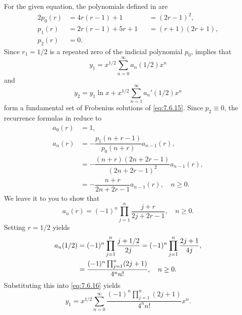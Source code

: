 \begin{solution}
For  the given equation, the polynomials defined in
 are
\begin{alignat*}{2}
p_0(r)&=4r(r-1)+1&&=(2r-1)^2,\\[5pt]
p_1(r)&=2r(r-1)+5r+1&&=(r+1)(2r+1),\\[5pt]
p_2(r)&=0.
\end{alignat*}
Since $r_1=1/2$ is a repeated zero of the  indicial polynomial $p_0$,
 implies that
\begin{equation} \label{eq:7.6.16}
y_1=x^{1/2}\sum_{n=0}^\infty  a_n(1/2)x^n
\end{equation}
and
\begin{equation} \label{eq:7.6.17}
y_2=y_1\ln x+x^{1/2}\sum_{n=1}^\infty a_n'(1/2)x^n
\end{equation}
form a fundamental set of Frobenius solutions of \eqref{eq:7.6.15}.
Since $p_2\equiv0$, the recurrence formulas in 
 reduce to
\begin{align*}
a_0(r)&=1,\\
a_n(r)&=-\dfrac{p_1(n+r-1)}{p_0(n+r)}a_{n-1}(r),\\
&=-\dfrac{(n+r)(2n+2r-1)}{(2n+2r-1)^2}a_{n-1}(r),\\
&=-\dfrac{n+r}{2n+2r-1}a_{n-1}(r),\quad n\ge0.
\end{align*}
We leave it to you to show that
\begin{equation} \label{eq:7.6.18}
a_n(r)=(-1)^n\prod_{j=1}^n\frac{j+r}{2j+2r-1},\quad n\ge0.
\end{equation}
Setting $r=1/2$  yields
\begin{equation} \label{eq:7.6.19}
\begin{aligned}
a_n(1/2)&=(-1)^n\displaystyle\prod_{j=1}^n\dfrac{j+1/2}{2j}=
(-1)^n\prod_{j=1}^n\dfrac{2j+1}{4j},\\
&=\displaystyle\frac{(-1)^n\prod_{j=1}^n(2j+1)}{4^nn!},\quad n\ge0.
\end{aligned}
\end{equation}
Substituting this into \eqref{eq:7.6.16} yields
\[
y_1=x^{1/2}\sum_{n=0}^\infty\frac{(-1)^n\prod_{j=1}^n(2j+1)}{4^nn!}x^n.
\]


\end{solution}
